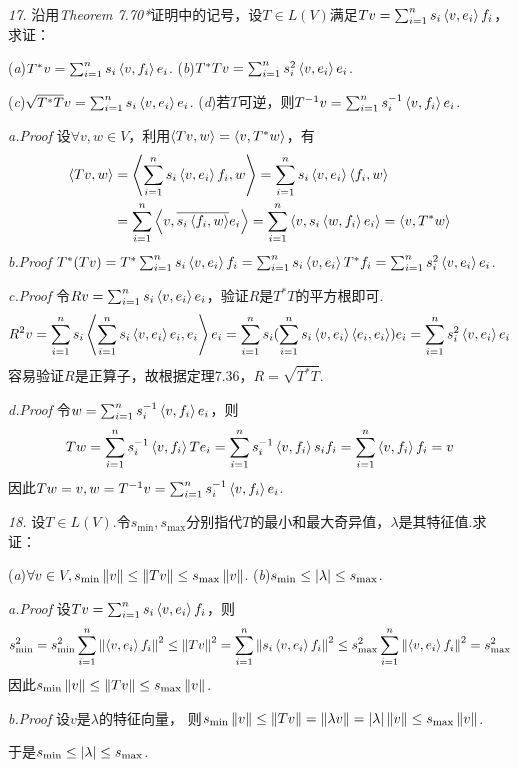 \newpage

\textit{17.}
沿用\textit{Theorem 7.70*}证明中的记号，设\(T \in L(V)\)满足\(Tv=\sum_{i=1}^n s_i\left\langle v,e_i \right\rangle f_i\)，求证：

(\textit{a})\(T^*v=\sum_{i=1}^n s_i\left\langle v,f_i \right\rangle e_i\). \quad
(\textit{b})\(T^*Tv=\sum_{i=1}^n s_i^2 \left\langle v,e_i \right\rangle e_i\). 

(\textit{c})\(\sqrt{T^*T}v=\sum_{i=1}^n s_i\left\langle v,e_i \right\rangle e_i\). \quad
(\textit{d})若\(T\)可逆，则\(T^{-1}v=\sum_{i=1}^n s_i^{-1}\left\langle v,f_i \right\rangle e_i\).

\textit{a.Proof}
设\(\forall v,w \in V\)，利用\(\left\langle Tv,w \right\rangle=\left\langle v,T^*w \right\rangle\)，有
    \begin{align*}
        \left\langle Tv,w \right\rangle&=\left\langle \sum_{i=1}^n s_i\left\langle v,e_i \right\rangle f_i,w \right\rangle=\sum_{i=1}^n s_i\left\langle v,e_i \right\rangle\left\langle f_i,w \right\rangle \\
        &=\sum_{i=1}^n \left\langle v,\overline{s_i\left\langle f_i,w \right\rangle}e_i \right\rangle=\sum_{i=1}^n \left\langle v,s_i\left\langle w,f_i \right\rangle e_i \right\rangle=\left\langle v,T^*w \right\rangle
    \end{align*}
\textit{b.Proof}
\(T^*(Tv)=T^*\sum_{i=1}^n s_i \left\langle v,e_i \right\rangle f_i=\sum_{i=1}^n s_i \left\langle v,e_i \right\rangle T^*f_i=\sum_{i=1}^n s_i^2 \left\langle v,e_i \right\rangle e_i\).

\textit{c.Proof}
令\(Rv=\sum_{i=1}^n s_i\left\langle v,e_i \right\rangle e_i\)，验证\(R\)是\(T^*T\)的平方根即可.
    \begin{align*}
        R^2v=\sum_{i=1}^n s_i\left\langle \sum_{i=1}^n s_i\left\langle v,e_i \right\rangle e_i,e_i \right\rangle e_i
        =\sum_{i=1}^n s_i (\sum_{i=1}^n s_i\left\langle v,e_i \right\rangle\left\langle e_i,e_i \right\rangle)e_i
        =\sum_{i=1}^n s_i^2\left\langle v,e_i \right\rangle e_i
    \end{align*}
容易验证\(R\)是正算子，故根据定理7.36，\(R=\sqrt{T^*T}\).

\textit{d.Proof}
令\(w=\sum_{i=1}^n s_i^{-1}\left\langle v,f_i \right\rangle e_i\)，则
    \begin{align*}
        Tw=\sum_{i=1}^n s_i^{-1}\left\langle v,f_i \right\rangle Te_i=\sum_{i=1}^n s_i^{-1}\left\langle v,f_i \right\rangle s_if_i
        =\sum_{i=1}^n \left\langle v,f_i \right\rangle f_i=v
    \end{align*}
因此\(Tw=v,w=T^{-1}v=\sum_{i=1}^n s_i^{-1}\left\langle v,f_i \right\rangle e_i\).

\hspace*{\fill}

\textit{18.}
设\(T \in L(V)\).令\(s_{\min},s_{\max}\)分别指代\(T\)的最小和最大奇异值，\(\lambda\)是其特征值.求证：

(\textit{a})\(\forall v \in V,s_{\min}\left\lVert v \right\rVert \leq \left\lVert Tv \right\rVert \leq s_{\max}\left\lVert v \right\rVert\). \quad
(\textit{b})\(s_{\min} \leq \left\lvert \lambda \right\rvert \leq s_{\max}\).

\textit{a.Proof}
设\(Tv=\sum_{i=1}^n s_i\left\langle v,e_i \right\rangle f_i\)，则
    \begin{align*}
        s_{\min}^2=s_{\min}^2 \sum_{i=1}^n \left\lVert \left\langle v,e_i \right\rangle f_i \right\rVert^2 \leq \left\lVert Tv \right\rVert^2
        =\sum_{i=1}^n \left\lVert s_i\left\langle v,e_i \right\rangle f_i \right\rVert^2 \leq s_{\max}^2 \sum_{i=1}^n \left\lVert \left\langle v,e_i \right\rangle f_i \right\rVert^2=s_{\max}^2
    \end{align*}
因此\(s_{\min}\left\lVert v \right\rVert \leq \left\lVert Tv \right\rVert \leq s_{\max}\left\lVert v \right\rVert\).

\textit{b.Proof}
设\(v\)是\(\lambda\)的特征向量，
则\(s_{\min}\left\lVert v \right\rVert\leq \left\lVert Tv \right\rVert=\left\lVert \lambda v \right\rVert=\left\lvert \lambda \right\rvert\left\lVert v \right\rVert \leq s_{\max}\left\lVert v \right\rVert\).

于是\(s_{\min} \leq \left\lvert \lambda \right\rvert \leq s_{\max}\).

